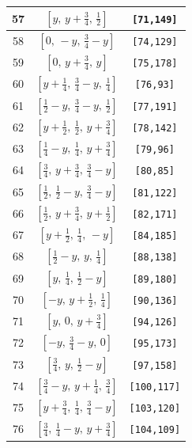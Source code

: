 \documentclass[fleqn,8pt]{jsarticle}
\begin{document}
\begin{longtable}{ccc}
57 & $\left[ y,\, y + \frac{3}{4},\, \frac{1}{2} \right]$ & {\tt [71,149]} \\ \hline
58 & $\left[ 0,\, - y,\, \frac{3}{4} - y \right]$ & {\tt [74,129]} \\ \hline
59 & $\left[ 0,\, y + \frac{3}{4},\, y \right]$ & {\tt [75,178]} \\ \hline
60 & $\left[ y + \frac{1}{4},\, \frac{3}{4} - y,\, \frac{1}{4} \right]$ & {\tt [76,93]} \\ \hline
61 & $\left[ \frac{1}{2} - y,\, \frac{3}{4} - y,\, \frac{1}{2} \right]$ & {\tt [77,191]} \\ \hline
62 & $\left[ y + \frac{1}{2},\, \frac{1}{2},\, y + \frac{3}{4} \right]$ & {\tt [78,142]} \\ \hline
63 & $\left[ \frac{1}{4} - y,\, \frac{1}{4},\, y + \frac{3}{4} \right]$ & {\tt [79,96]} \\ \hline
64 & $\left[ \frac{3}{4},\, y + \frac{3}{4},\, \frac{3}{4} - y \right]$ & {\tt [80,85]} \\ \hline
65 & $\left[ \frac{1}{2},\, \frac{1}{2} - y,\, \frac{3}{4} - y \right]$ & {\tt [81,122]} \\ \hline
66 & $\left[ \frac{1}{2},\, y + \frac{3}{4},\, y + \frac{1}{2} \right]$ & {\tt [82,171]} \\ \hline
67 & $\left[ y + \frac{1}{2},\, \frac{1}{4},\, - y \right]$ & {\tt [84,185]} \\ \hline
68 & $\left[ \frac{1}{2} - y,\, y,\, \frac{1}{4} \right]$ & {\tt [88,138]} \\ \hline
69 & $\left[ y,\, \frac{1}{4},\, \frac{1}{2} - y \right]$ & {\tt [89,180]} \\ \hline
70 & $\left[ - y,\, y + \frac{1}{2},\, \frac{1}{4} \right]$ & {\tt [90,136]} \\ \hline
71 & $\left[ y,\, 0,\, y + \frac{3}{4} \right]$ & {\tt [94,126]} \\ \hline
72 & $\left[ - y,\, \frac{3}{4} - y,\, 0 \right]$ & {\tt [95,173]} \\ \hline
73 & $\left[ \frac{3}{4},\, y,\, \frac{1}{2} - y \right]$ & {\tt [97,158]} \\ \hline
74 & $\left[ \frac{3}{4} - y,\, y + \frac{1}{4},\, \frac{3}{4} \right]$ & {\tt [100,117]} \\ \hline
75 & $\left[ y + \frac{3}{4},\, \frac{1}{4},\, \frac{3}{4} - y \right]$ & {\tt [103,120]} \\ \hline
76 & $\left[ \frac{3}{4},\, \frac{1}{4} - y,\, y + \frac{3}{4} \right]$ & {\tt [104,109]} \\ \hline

\end{longtable}
\end{document}
